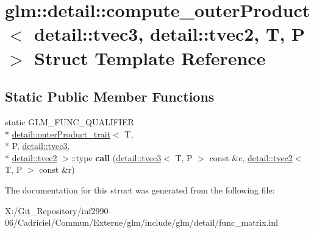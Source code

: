 \hypertarget{structglm_1_1detail_1_1compute__outer_product_3_01detail_1_1tvec3_00_01detail_1_1tvec2_00_01_t_00_01_p_01_4}{\section{glm\-:\-:detail\-:\-:compute\-\_\-outer\-Product$<$ detail\-:\-:tvec3, detail\-:\-:tvec2, T, P $>$ Struct Template Reference}
\label{structglm_1_1detail_1_1compute__outer_product_3_01detail_1_1tvec3_00_01detail_1_1tvec2_00_01_t_00_01_p_01_4}
}
\subsection*{Static Public Member Functions}
\begin{DoxyCompactItemize}
\item 
\hypertarget{structglm_1_1detail_1_1compute__outer_product_3_01detail_1_1tvec3_00_01detail_1_1tvec2_00_01_t_00_01_p_01_4_a96862a6cc9a974bd7dcc4068f433ccf5}{static G\-L\-M\-\_\-\-F\-U\-N\-C\-\_\-\-Q\-U\-A\-L\-I\-F\-I\-E\-R \\*
\hyperlink{structglm_1_1detail_1_1outer_product__trait}{detail\-::outer\-Product\-\_\-trait}$<$ T, \\*
P, \hyperlink{structglm_1_1detail_1_1tvec3}{detail\-::tvec3}, \\*
\hyperlink{structglm_1_1detail_1_1tvec2}{detail\-::tvec2} $>$\-::type {\bfseries call} (\hyperlink{structglm_1_1detail_1_1tvec3}{detail\-::tvec3}$<$ T, P $>$ const \&c, \hyperlink{structglm_1_1detail_1_1tvec2}{detail\-::tvec2}$<$ T, P $>$ const \&r)}\label{structglm_1_1detail_1_1compute__outer_product_3_01detail_1_1tvec3_00_01detail_1_1tvec2_00_01_t_00_01_p_01_4_a96862a6cc9a974bd7dcc4068f433ccf5}

\end{DoxyCompactItemize}


The documentation for this struct was generated from the following file\-:\begin{DoxyCompactItemize}
\item 
X\-:/\-Git\-\_\-\-Repository/inf2990-\/06/\-Cadriciel/\-Commun/\-Externe/glm/include/glm/detail/func\-\_\-matrix.\-inl\end{DoxyCompactItemize}
